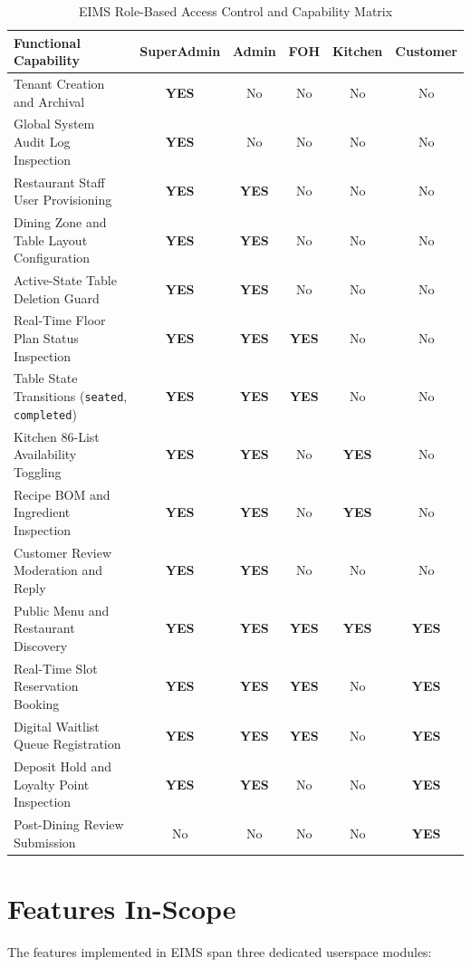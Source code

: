 \begin{table}[htbp]
\centering
\caption{EIMS Role-Based Access Control and Capability Matrix}
\label{tab:role_permissions_matrix}
\small
\begin{tabularx}{\textwidth}{lccccc}
\toprule
\textbf{Functional Capability} & \textbf{SuperAdmin} & \textbf{Admin} & \textbf{FOH} & \textbf{Kitchen} & \textbf{Customer} \\
\midrule
Tenant Creation and Archival & \textbf{YES} & No & No & No & No \\
Global System Audit Log Inspection & \textbf{YES} & No & No & No & No \\
Restaurant Staff User Provisioning & \textbf{YES} & \textbf{YES} & No & No & No \\
Dining Zone and Table Layout Configuration & \textbf{YES} & \textbf{YES} & No & No & No \\
Active-State Table Deletion Guard & \textbf{YES} & \textbf{YES} & No & No & No \\
Real-Time Floor Plan Status Inspection & \textbf{YES} & \textbf{YES} & \textbf{YES} & No & No \\
Table State Transitions (\texttt{seated}, \texttt{completed}) & \textbf{YES} & \textbf{YES} & \textbf{YES} & No & No \\
Kitchen 86-List Availability Toggling & \textbf{YES} & \textbf{YES} & No & \textbf{YES} & No \\
Recipe BOM and Ingredient Inspection & \textbf{YES} & \textbf{YES} & No & \textbf{YES} & No \\
Customer Review Moderation and Reply & \textbf{YES} & \textbf{YES} & No & No & No \\
Public Menu and Restaurant Discovery & \textbf{YES} & \textbf{YES} & \textbf{YES} & \textbf{YES} & \textbf{YES} \\
Real-Time Slot Reservation Booking & \textbf{YES} & \textbf{YES} & \textbf{YES} & No & \textbf{YES} \\
Digital Waitlist Queue Registration & \textbf{YES} & \textbf{YES} & \textbf{YES} & No & \textbf{YES} \\
Deposit Hold and Loyalty Point Inspection & \textbf{YES} & \textbf{YES} & No & No & \textbf{YES} \\
Post-Dining Review Submission & No & No & No & No & \textbf{YES} \\
\bottomrule
\end{tabularx}
\end{table}

\section{Features In-Scope}
\label{sec:scope_features}
The features implemented in EIMS span three dedicated userspace modules:

